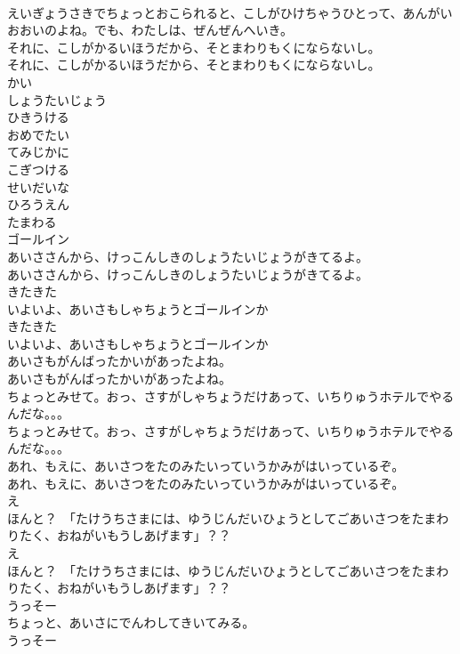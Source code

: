 \documentclass[8pt]{extreport}
\begin{document}
\begin{CJK}{UTF8}{min}
\\	えいぎょうさきでちょっとおこられると、こしがひけちゃうひとって、あんがいおおいのよね。でも、わたしは、ぜんぜんへいき。
\\	それに、こしがかるいほうだから、そとまわりもくにならないし。
\\	それに、こしがかるいほうだから、そとまわりもくにならないし。
\\	かい
\\	しょうたいじょう
\\	ひきうける
\\	おめでたい
\\	てみじかに
\\	こぎつける
\\	せいだいな
\\	ひろうえん
\\	たまわる
\\	ゴールイン
\\	あいささんから、けっこんしきのしょうたいじょうがきてるよ。
\\	あいささんから、けっこんしきのしょうたいじょうがきてるよ。
\\	きたきた
\\	いよいよ、あいさもしゃちょうとゴールインか
\\	きたきた
\\	いよいよ、あいさもしゃちょうとゴールインか
\\	あいさもがんばったかいがあったよね。
\\	あいさもがんばったかいがあったよね。
\\	ちょっとみせて。おっ、さすがしゃちょうだけあって、いちりゅうホテルでやるんだな。。。
\\	ちょっとみせて。おっ、さすがしゃちょうだけあって、いちりゅうホテルでやるんだな。。。
\\	あれ、もえに、あいさつをたのみたいっていうかみがはいっているぞ。
\\	あれ、もえに、あいさつをたのみたいっていうかみがはいっているぞ。
\\	え
\\	ほんと？　「たけうちさまには、ゆうじんだいひょうとしてごあいさつをたまわりたく、おねがいもうしあげます」？？
\\	え
\\	ほんと？　「たけうちさまには、ゆうじんだいひょうとしてごあいさつをたまわりたく、おねがいもうしあげます」？？
\\	うっそー
\\	ちょっと、あいさにでんわしてきいてみる。
\\	うっそー

\end{CJK}
\end{document}
